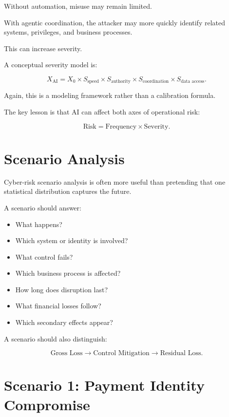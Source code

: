 Without automation, misuse may remain limited.

With agentic coordination, the attacker may more quickly identify related systems, privileges, and business processes.

This can increase severity.

A conceptual severity model is:

\begin{equation}
X_{\text{AI}}
=
X_0
\times
S_{\text{speed}}
\times
S_{\text{authority}}
\times
S_{\text{coordination}}
\times
S_{\text{data access}}.
\end{equation}

Again, this is a modeling framework rather than a calibration formula.

The key lesson is that AI can affect both axes of operational risk:

\begin{equation}
\text{Risk}
=
\text{Frequency}
\times
\text{Severity}.
\end{equation}

\section{Scenario Analysis}

Cyber-risk scenario analysis is often more useful than pretending that one statistical distribution captures the future.

A scenario should answer:

\begin{itemize}
    \item What happens?
    \item Which system or identity is involved?
    \item What control fails?
    \item Which business process is affected?
    \item How long does disruption last?
    \item What financial losses follow?
    \item Which secondary effects appear?
\end{itemize}

A scenario should also distinguish:

\begin{equation}
\text{Gross Loss}
\rightarrow
\text{Control Mitigation}
\rightarrow
\text{Residual Loss}.
\end{equation}

\section{Scenario 1: Payment Identity Compromise}

